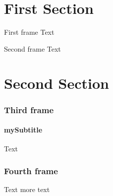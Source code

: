 \documentclass{beamer}
\begin{document}
\section{First Section}

\begin{frame}
\tableofcontents[sections=\value{section}]
\end{frame}

\begin{frame}{First frame}
Text
\end{frame}

\begin{frame}{Second frame}
Text
\end{frame}



\section{Second Section}

\begin{frame}
\frametitle{Third frame}
\framesubtitle{mySubtitle}
Text
\end{frame}

\begin{frame}
\frametitle{Fourth frame}
Text
\pause
more text
\end{frame}
\end{document}
